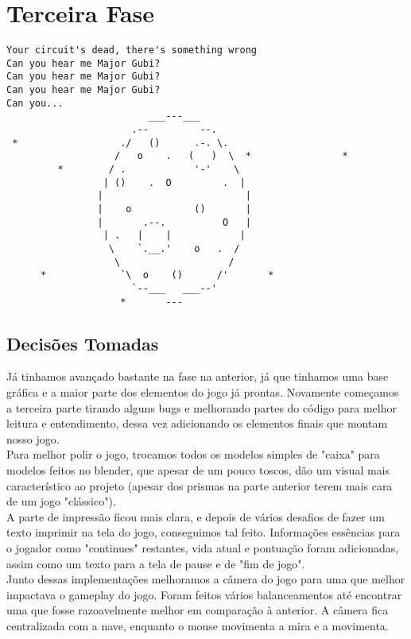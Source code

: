 \documentclass[12pt,a4paper]{article}
\begin{document}
		
	\newpage	
	\section{Terceira Fase}
	\begin{verbatim}
Your circuit's dead, there's something wrong
Can you hear me Major Gubi?
Can you hear me Major Gubi?
Can you hear me Major Gubi?
Can you...             
                         ___---___
                      .--         --.
 *                  ./   ()      .-. \.
                   /   o    .   (   )  \  *                *
         *        / .            '-'    \
                 | ()    .  O         .  |
                |                         |
                |    o           ()       |
                |       .--.          O   |
                 | .   |    |            |
                  \    `.__.'    o   .  /
                   \                   /
      *             `\  o    ()      /'       *
                      `--___   ___--'
                    *       ---

	\end{verbatim}
  \subsection{Decisões Tomadas}
        Já tinhamos avançado bastante na fase na anterior, já que tinhamos uma base gráfica e a maior parte
    dos elementos do jogo já prontas. Novamente começamos a terceira parte tirando alguns bugs e melhorando 
    partes do código para melhor leitura e entendimento, dessa vez adicionando os elementos finais que montam
    nosso jogo. \\
    
        Para melhor polir o jogo, trocamos todos os modelos simples de "caixa" para modelos feitos no blender, que
    apesar de um pouco toscos, dão um visual mais característico ao projeto (apesar dos prismas na parte anterior
    terem mais cara de um jogo "clássico").\\
    
        A parte de impressão ficou mais clara, e depois de vários desafios de fazer um texto imprimir na tela do jogo, 
    conseguimos tal feito. Informações essências para o jogador como "continues" restantes, vida atual e pontuação 
    foram adicionadas, assim como um texto para a tela de pause e de "fim de jogo".\\
        
        Junto dessas implementações melhoramos a câmera do jogo para uma que melhor impactava o gameplay do jogo. Foram feitos
    vários balanceamentos até encontrar uma que fosse razoavelmente melhor em comparação à anterior. A câmera fica 
    centralizada com a nave, enquanto o mouse movimenta a mira e a movimenta.\\
    
\end{document}

